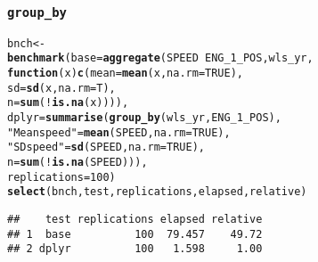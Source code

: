 \documentclass{beamer}\usepackage[]{graphicx}\usepackage[]{color}
\makeatletter
\newcommand{\hlnum}[1]{\textcolor[rgb]{0.686,0.059,0.569}{#1}}%
\newcommand{\hlstr}[1]{\textcolor[rgb]{0.192,0.494,0.8}{#1}}%
\newcommand{\hlopt}[1]{\textcolor[rgb]{0,0,0}{#1}}%
\newcommand{\hlstd}[1]{\textcolor[rgb]{0.345,0.345,0.345}{#1}}%
\newcommand{\hlkwa}[1]{\textcolor[rgb]{0.161,0.373,0.58}{\textbf{#1}}}%
\newcommand{\hlkwb}[1]{\textcolor[rgb]{0.69,0.353,0.396}{#1}}%
\newcommand{\hlkwc}[1]{\textcolor[rgb]{0.333,0.667,0.333}{#1}}%
\newcommand{\hlkwd}[1]{\textcolor[rgb]{0.737,0.353,0.396}{\textbf{#1}}}%
\newenvironment{kframe}{%
 \def\at@end@of@kframe{}%
 \ifinner\ifhmode%
  \def\at@end@of@kframe{\end{minipage}}%
  \begin{minipage}{\columnwidth}%
 \fi\fi%
 \def\FrameCommand##1{\hskip\@totalleftmargin \hskip-\fboxsep
 \colorbox{shadecolor}{##1}\hskip-\fboxsep
     \hskip-\linewidth \hskip-\@totalleftmargin \hskip\columnwidth}%
 \MakeFramed {\advance\hsize-\width
   \@totalleftmargin\z@ \linewidth\hsize
   \@setminipage}}%
 {\par\unskip\endMakeFramed%
 \at@end@of@kframe}
\newenvironment{knitrout}{}{} %
\makeatother
\begin{document}
\begin{frame}[fragile]
  \frametitle{{\tt group\_by}}
\begin{knitrout}\footnotesize
{}\color{fgcolor}\begin{kframe}
\begin{alltt}
\hlstd{bnch} \hlkwb{<-}
  \hlkwd{benchmark}\hlstd{(}\hlkwc{base} \hlstd{=} \hlkwd{aggregate}\hlstd{(SPEED} \hlopt{~} \hlstd{ENG_1_POS, wls_yr,}
                             \hlkwa{function}\hlstd{(}\hlkwc{x}\hlstd{)} \hlkwd{c}\hlstd{(}\hlkwc{mean} \hlstd{=} \hlkwd{mean}\hlstd{(x,} \hlkwc{na.rm} \hlstd{=} \hlnum{TRUE}\hlstd{),}
                                           \hlkwc{sd}   \hlstd{=} \hlkwd{sd}\hlstd{(x,} \hlkwc{na.rm} \hlstd{= T),}
                                           \hlkwc{n}    \hlstd{=} \hlkwd{sum}\hlstd{(}\hlopt{!}\hlkwd{is.na}\hlstd{(x)))),}
            \hlkwc{dplyr} \hlstd{=} \hlkwd{summarise}\hlstd{(}\hlkwd{group_by}\hlstd{(wls_yr, ENG_1_POS),}
                              \hlstr{"Mean speed"} \hlstd{=} \hlkwd{mean}\hlstd{(SPEED,} \hlkwc{na.rm} \hlstd{=} \hlnum{TRUE}\hlstd{),}
                              \hlstr{"SD speed"}   \hlstd{=} \hlkwd{sd}\hlstd{(SPEED,} \hlkwc{na.rm} \hlstd{=} \hlnum{TRUE}\hlstd{),}
                              \hlkwc{n}            \hlstd{=} \hlkwd{sum}\hlstd{(}\hlopt{!}\hlkwd{is.na}\hlstd{(SPEED))),}
            \hlkwc{replications} \hlstd{=} \hlnum{100}\hlstd{)}
\hlkwd{select}\hlstd{(bnch, test, replications, elapsed, relative)}
\end{alltt}
\begin{verbatim}
##    test replications elapsed relative
## 1  base          100  79.457    49.72
## 2 dplyr          100   1.598     1.00
\end{verbatim}
\end{kframe}
\end{knitrout}
\end{frame} 
\end{document}
